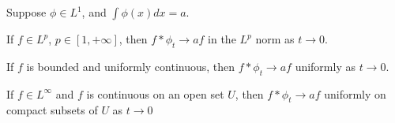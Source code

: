 \documentclass[../../main.tex]{subfiles}
\begin{document}
\providecommand{\cnv}{\ast}
\providecommand{\zint}{\int\limits_{z\in\real^n}}
\providecommand{\ubc}{\operatorname{UBC}}
\begin{wts}
    Suppose $\phi\in L^1$, and $\int\phi(x)dx=a$.
    \begin{enumalpha}
        \item If $f\in L^p$, $p\in[1,+\infty]$, then $f\ast \phi_t\to af$ in the $L^p$ norm as $t\to 0$.
        \item If $f$ is bounded and uniformly continuous, then $f\ast \phi_t\to af$ uniformly as $t\to 0$.
        \item If $f\in L^\infty$ and $f$ is continuous on an open set $U$, then $f\ast \phi_t\to af$ uniformly on compact subsets of $U$ as $t\to 0$
    \end{enumalpha}
\end{wts}
\end{document}

